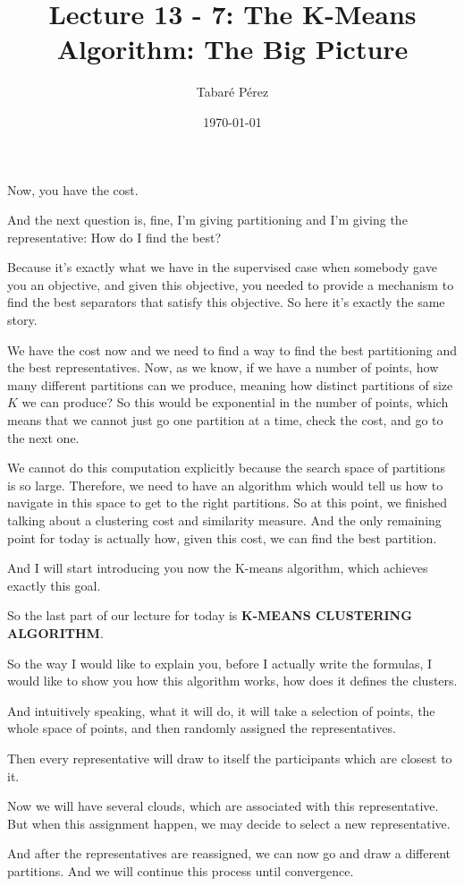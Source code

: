 \documentclass[a4paper, 12pt]{article}
\author{Tabaré Pérez}
\date{\today}
\title{Lecture 13 - 7: The K-Means Algorithm: The Big Picture}
\begin{document}
\maketitle
Now, you have the cost.

And the next question is, fine, I'm giving partitioning and I'm giving the
representative: How do I find the best?

Because it's exactly what we have in the supervised case when somebody gave you
an objective, and given this objective, you needed to provide a mechanism to
find the best separators that satisfy this objective. So here it's exactly the
same story.

We have the cost now and we need to find a way to find the best partitioning and
the best representatives. Now, as we know, if we have a number of points, how
many different partitions can we produce, meaning how distinct partitions of
size \(K\) we can produce? So this would be exponential in the number of points,
which means that we cannot just go one partition at a time, check the cost, and
go to the next one.

We cannot do this computation explicitly because the search space of partitions
is so large. Therefore, we need to have an algorithm which would tell us how to
navigate in this space to get to the right partitions. So at this point, we
finished talking about a clustering cost and similarity measure. And the only
remaining point for today is actually how, given this cost, we can find the best
partition.

And I will start introducing you now the K-means algorithm, which achieves
exactly this goal.

So the last part of our lecture for today is \textbf{K-MEANS CLUSTERING ALGORITHM}.

So the way I would like to explain you, before I actually write the formulas, I
would like to show you how this algorithm works, how does it defines the
clusters.

And intuitively speaking, what it will do, it will take a selection of points,
the whole space of points, and then randomly assigned the representatives.

Then every representative will draw to itself the participants which are closest
to it.

Now we will have several clouds, which are associated with this representative.
But when this assignment happen, we may decide to select a new representative.

And after the representatives are reassigned, we can now go and draw a different
partitions. And we will continue this process until convergence.
\end{document}
